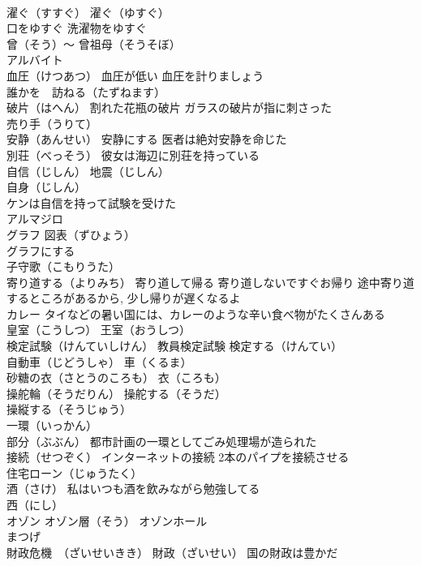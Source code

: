 \documentclass[8pt]{extreport}
\begin{document}
\begin{CJK}{UTF8}{min}
\\	濯ぐ（すすぐ） 濯ぐ（ゆすぐ）
\\	口をゆすぐ 洗濯物をゆすぐ
\\	曾（そう）～ 曾祖母（そうそぼ）
\\	アルバイト
\\	血圧（けつあつ） 血圧が低い 血圧を計りましょう
\\	誰かを　訪ねる（たずねます）
\\	破片（はへん） 割れた花瓶の破片 ガラスの破片が指に刺さった
\\	売り手（うりて）
\\	安静（あんせい） 安静にする 医者は絶対安静を命じた
\\	別荘（べっそう） 彼女は海辺に別荘を持っている
\\	自信（じしん） 地震（じしん） 
\\	自身（じしん） 
\\	ケンは自信を持って試験を受けた
\\	アルマジロ
\\	グラフ 図表（ずひょう）
\\	グラフにする
\\	子守歌（こもりうた）
\\	寄り道する（よりみち） 寄り道して帰る 寄り道しないですぐお帰り 途中寄り道するところがあるから, 少し帰りが遅くなるよ
\\	カレー タイなどの暑い国には、カレーのような辛い食べ物がたくさんある
\\	皇室（こうしつ） 王室（おうしつ）
\\	検定試験（けんていしけん） 教員検定試験 検定する（けんてい）
\\	自動車（じどうしゃ） 車（くるま）
\\	砂糖の衣（さとうのころも） 衣（ころも） 
\\	操舵輪（そうだりん） 操舵する（そうだ）
\\	操縦する（そうじゅう）
\\	一環（いっかん）
\\	部分（ぶぶん） 都市計画の一環としてごみ処理場が造られた
\\	接続（せつぞく） インターネットの接続 2本のパイプを接続させる
\\	住宅ローン（じゅうたく）
\\	酒（さけ） 私はいつも酒を飲みながら勉強してる
\\	西（にし）
\\	オゾン オゾン層（そう） オゾンホール
\\	まつげ
\\	財政危機　（ざいせいきき） 財政（ざいせい） 国の財政は豊かだ

\end{CJK}
\end{document}
